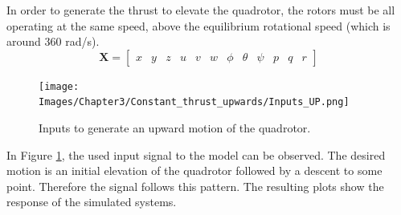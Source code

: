 In order to generate the thrust to elevate the quadrotor, the rotors must be all operating at the same speed, above the equilibrium rotational speed (which is around 360 rad/s). 
\begin{equation} \label{eq:statevector}
\mathbf{X} = \begin{bmatrix} x & y & z & u & v & w & \phi & \theta & \psi & p & q & r \end{bmatrix}
\end{equation} 
\begin{figure}[h!]
\centering
\texttt{[image: Images/Chapter3/Constant\_thrust\_upwards/Inputs\_UP.png]}
\caption{Inputs to generate an upward motion of the quadrotor.}
\label{fig:upwards_inputs}
\end{figure}

In Figure \ref{fig:upwards_inputs}, the used input signal to the model can be observed. The desired motion is an initial elevation of the quadrotor followed by a descent to some point. Therefore the signal follows this pattern. The resulting plots show the response of the simulated systems. 

